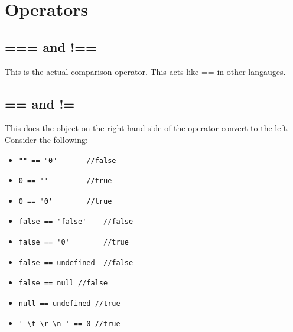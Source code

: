 \documentclass {article}
\begin{document}
		
\section{Operators}
	\subsection{=== and !==}
		This is the actual comparison operator.  This acts like == in other langauges.
	\subsection{== and !=}
		This does the object on the right hand side of the operator convert to the left.  
		Consider the following: 

		\begin{itemize}
			\item \begin{lstlisting} 
"" == "0" 		//false
				\end{lstlisting} 

			\item \begin{lstlisting} 
0 == '' 		//true
				\end{lstlisting} 

			\item \begin{lstlisting} 
0 == '0' 		//true
				\end{lstlisting} 
		\end{itemize}


		\begin{itemize}
			\item \begin{lstlisting} 
false == 'false' 	//false 
				\end{lstlisting}

			\item \begin{lstlisting} 
false == '0'	 	//true
				\end{lstlisting} 
		\end{itemize}


		\begin{itemize}
			\item \begin{lstlisting} 
false == undefined 	//false
				\end{lstlisting} 

			\item \begin{lstlisting} 
false == null //false
				\end{lstlisting} 

			\item \begin{lstlisting} 
null == undefined //true
				\end{lstlisting} 

			\item \begin{lstlisting} 
' \t \r \n ' == 0 //true
				\end{lstlisting} 

		\end{itemize}
\end{document}
